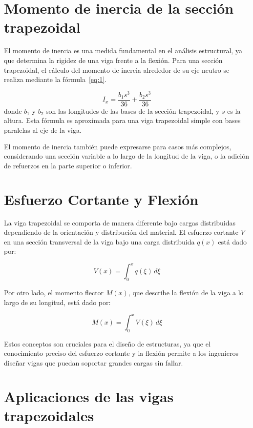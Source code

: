 \section{Momento de inercia de la sección trapezoidal}

El momento de inercia es una medida fundamental en el análisis estructural, ya que determina la rigidez de una viga frente a la flexión. Para una sección trapezoidal, el cálculo del momento de inercia alrededor de su eje neutro se realiza mediante la fórmula~\eqref{eq:1}.

\begin{equation}
I_x = \frac{b_1 s^3}{36} + \frac{b_2 s^3}{36}
\label{eq:1}
\end{equation}
donde $b_1$ y $b_2$ son las longitudes de las bases de la sección trapezoidal, y $s$ es la altura. Esta fórmula es aproximada para una viga trapezoidal simple con bases paralelas al eje de la viga.

El momento de inercia también puede expresarse para casos más complejos, considerando una sección variable a lo largo de la longitud de la viga, o la adición de refuerzos en la parte superior o inferior.

\section{Esfuerzo Cortante y Flexión}

La viga trapezoidal se comporta de manera diferente bajo cargas distribuidas dependiendo de la orientación y distribución del material. El esfuerzo cortante $V$ en una sección transversal de la viga bajo una carga distribuida $q(x)$ está dado por:

\begin{equation}
V(x) = \int_0^x q(\xi)\, d\xi
\end{equation}

Por otro lado, el momento flector $M(x)$, que describe la flexión de la viga a lo largo de su longitud, está dado por:

\begin{equation}
M(x) = \int_0^x V(\xi)\, d\xi
\end{equation}

Estos conceptos son cruciales para el diseño de estructuras, ya que el conocimiento preciso del esfuerzo cortante y la flexión permite a los ingenieros diseñar vigas que puedan soportar grandes cargas sin fallar.

\section{Aplicaciones de las vigas trapezoidales}

